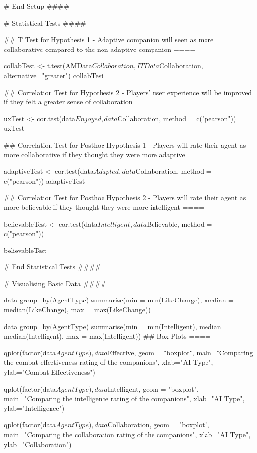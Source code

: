 \documentclass{IEEEtran}
\begin{document}
\begin{verbnobox}[\fontsize{10pt}{10pt}\selectfont]
# End Setup ####


# Statistical Tests ####

## T Test for Hypothesis 1 - Adaptive companion will seen as more collaborative compared to 
the non adaptive companion ====

collabTest <- t.test(AMData$Collaboration, ITData$Collaboration, 
                     alternative="greater")
collabTest

## Correlation Test for Hypothesis 2 - Players' user experience will be improved if they felt
a greater sense of collaboration ====

uxTest <- cor.test(data$Enjoyed, data$Collaboration,
                   method = c("pearson"))
uxTest

## Correlation Test for Posthoc Hypothesis 1 - Players will rate their agent as more 
collaborative if they thought they were more adaptive ====

adaptiveTest <- cor.test(data$Adapted, data$Collaboration,
                       method = c("pearson"))
adaptiveTest

## Correlation Test for Posthoc Hypothesis 2 - Players will rate their agent as more 
believable if they thought they were more intelligent ====

believableTest <- cor.test(data$Intelligent, data$Believable, method = c("pearson"))

believableTest

# End Statistical Tests ####

# Visualising Basic Data ####


data %
  group_by(AgentType) %
  summarise(min = min(LikeChange), median = median(LikeChange), max = max(LikeChange))

data %
  group_by(AgentType) %
  summarise(min = min(Intelligent), median = median(Intelligent), max = max(Intelligent))
## Box Plots ====

qplot(factor(data$AgentType), data$Effective, geom = "boxplot", 
      main="Comparing the combat effectiveness rating of the companions", 
      xlab="AI Type", ylab="Combat Effectiveness")

qplot(factor(data$AgentType), data$Intelligent, geom = "boxplot", 
      main="Comparing the intelligence rating of the companions", 
      xlab="AI Type", ylab="Intelligence")

qplot(factor(data$AgentType), data$Collaboration, geom = "boxplot", 
      main="Comparing the collaboration rating of the companions", 
      xlab="AI Type", ylab="Collaboration")


\end{verbnobox}
\end{document}
